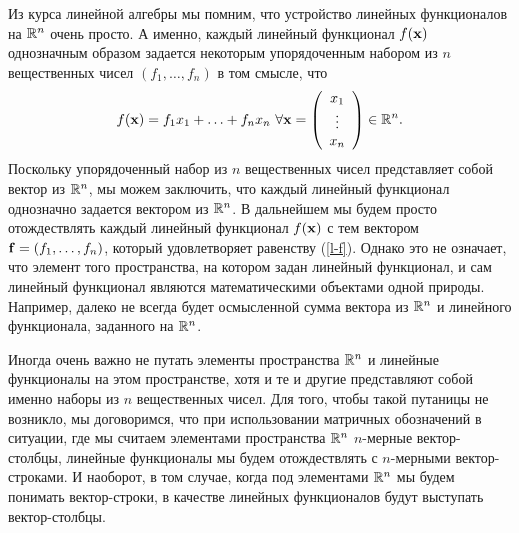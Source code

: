     Из курса линейной алгебры мы помним, что устройство линейных
    функционалов на $\mathbb{R}^{n}$ очень просто. А именно, каждый линейный
    функционал $f(\mathbf{x})$ однозначным образом задается некоторым упорядоченным
    набором из $n$ вещественных чисел $(f_{1},\ldots,f_{n})$ в том смысле, что
\begin{equation}
  \label{l-f}
    f(\mathbf{x})=f_{1}x_{1}+\ldots+f_{n}x_{n} \
    \forall \mathbf{x}=
    \left(
     \begin{array}{c}
        x_{1} \\
                \vdots \\
        x_{n}  \\
      \end{array}
    \right)\in \mathbb{R}^{n}.
\end{equation}
    Поскольку упорядоченный набор из $n$ вещественных чисел представляет собой вектор из
    $\mathbb{R}^{n}$, мы можем заключить, что каждый линейный функционал однозначно
    задается вектором из $\mathbb{R}^{n}$. В дальнейшем мы будем просто отождествлять каждый линейный
    функционал $f(\mathbf{x})$ с тем вектором $\mathbf{f}=(f_{1},\ldots,f_{n})$, который
    удовлетворяет равенству (\ref{l-f}).
    Однако это не означает, что
    элемент того пространства, на котором задан линейный функционал,
    и сам линейный функционал являются математическими объектами
    одной природы. Например, далеко не всегда будет осмысленной
    сумма вектора из $\mathbb{R}^{n}$ и линейного функционала, заданного на
    $\mathbb{R}^{n}$.

    Иногда очень важно не путать элементы пространства $\mathbb{R}^{n}$ и
    линейные функционалы на этом пространстве, хотя и те и другие
    представляют собой именно наборы из $n$ вещественных чисел. Для
    того, чтобы такой путаницы не возникло, мы договоримся, что при
    использовании матричных обозначений в ситуации, где мы
    считаем элементами пространства $\mathbb{R}^{n}$ $n$-мерные
    вектор-столбцы, линейные функционалы мы будем отождествлять с
    $n$-мерными вектор-строками. И наоборот, в том случае, когда под
    элементами $\mathbb{R}^{n}$ мы будем понимать вектор-строки, в качестве
    линейных функционалов будут выступать вектор-столбцы.

